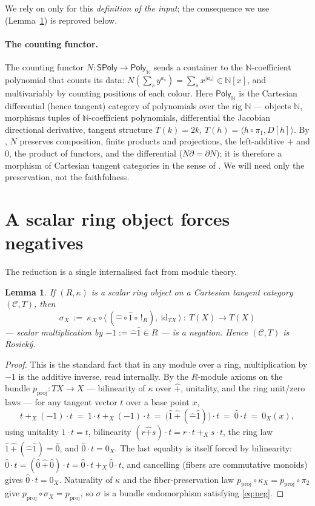 \documentclass[11pt]{article}
\newtheorem{lemma}[theorem]{Lemma}
\theoremstyle{definition}
\newcommand{\SPoly}{\mathsf{SPoly}}
\newcommand{\PolyN}{\mathsf{Poly}_{\mathbb{N}}}
\newcommand{\N}{\mathbb{N}}
\newcommand{\id}{\mathrm{id}}
\begin{document}
We rely on \cite{AintablianBlohmann2026} only for this \emph{definition of the input}; the
consequence we use (Lemma~\ref{lem:A}) is reproved below.

\paragraph{The counting functor.}
The counting functor $N:\SPoly\to\PolyN$ sends a container to the $\N$-coefficient
polynomial that counts its data: $N(\sum_s y^{a_s}) = \sum_s x^{|a_s|}\in\N[x]$, and
multivariably by counting positions of each colour. Here $\PolyN$ is the Cartesian
differential (hence tangent) category of polynomials over the rig $\N$ --- objects $\N$,
morphisms tuples of $\N$-coefficient polynomials, differential the Jacobian directional
derivative, tangent structure $T(k)=2k$, $T(h)=\langle h\circ\pi_1, D[h]\rangle$. By
\cite[Lemmas 3--5]{MacBethTangent}, $N$ preserves composition, finite products and
projections, the left-additive $+$ and $0$, the product of functors, and the differential
($N\partial=\partial N$); it is therefore a morphism of Cartesian tangent categories in the
sense of \cite{CockettCruttwell2014}. We will need only the preservation, not the
faithfulness.

\section{A scalar ring object forces negatives}\label{sec:lemmaA}

The reduction is a single internalised fact from module theory.

\begin{lemma}\label{lem:A}
If $(R,\kappa)$ is a scalar ring object on a Cartesian tangent category $(\mathcal C,T)$,
then
\[
   \sigma_X\ :=\ \kappa_X\circ\big\langle\, (\hat-\circ\hat1\circ\, !_R),\ \id_{T X}\,\big\rangle
   \ :\ T(X)\longrightarrow T(X)
\]
--- scalar multiplication by $-1:=\hat-\hat1\in R$ --- is a negation. Hence $(\mathcal
C,T)$ is Rosick\'y.
\end{lemma}

\begin{proof}
This is the standard fact that in any module over a ring, multiplication by $-1$ is the
additive inverse, read internally. By the $R$-module axioms on the bundle
$p_{\mathrm{proj}}:TX\to X$ --- bilinearity of $\kappa$ over $\hat+$, unitality, and the
ring unit/zero laws --- for any tangent vector $t$ over a base point $x$,
\[
   t\ +_X\ (-1)\cdot t\ =\ 1\cdot t\ +_X\ (-1)\cdot t\ =\ \big(\hat1\,\hat+\,(\hat-\hat1)\big)\cdot t
   \ =\ \hat0\cdot t\ =\ 0_X(x),
\]
using unitality $1\cdot t=t$, bilinearity $(r\hat+s)\cdot t=r\cdot t\ +_X\ s\cdot t$, the
ring law $\hat1\,\hat+\,(\hat-\hat1)=\hat0$, and $\hat0\cdot t=0_X$. The last equality is
itself forced by bilinearity: $\hat0\cdot t=(\hat0\,\hat+\,\hat0)\cdot t=\hat0\cdot t\ +_X\
\hat0\cdot t$, and cancelling (fibers are commutative monoids) gives $\hat0\cdot t=0_X$.
Naturality of $\kappa$ and the fiber-preservation law $p_{\mathrm{proj}}\circ\kappa_X=
p_{\mathrm{proj}}\circ\pi_2$ give $p_{\mathrm{proj}}\circ\sigma_X=p_{\mathrm{proj}}$, so
$\sigma$ is a bundle endomorphism satisfying \eqref{eq:neg}.
\end{proof}
\end{document}
